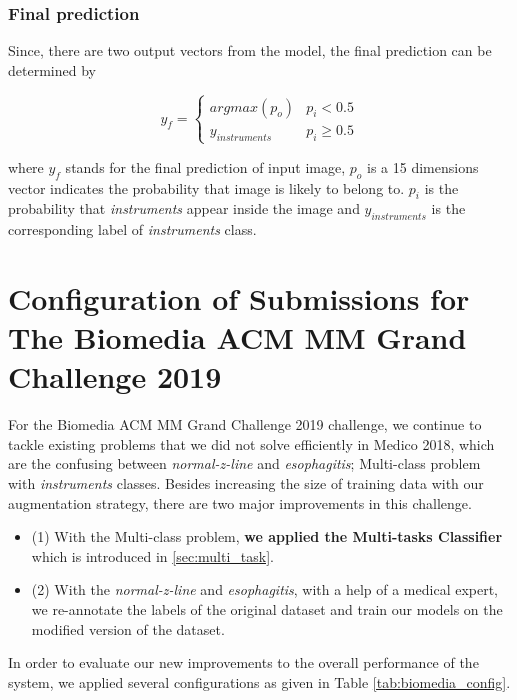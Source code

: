 \subsubsection*{Final prediction}
Since, there are two output vectors from the model, the final prediction can be determined by 

\begin{equation}
    y_{f} = \begin{cases}argmax(p_{o}) & p_{i} < 0.5\\y_{instruments} & p_{i} \geq 0.5\end{cases}
\end{equation}

where $y_{f}$ stands for the final prediction of input image, $p_{o}$ is a 15 dimensions vector indicates the probability that image is likely to belong to. $p_{i}$ is the probability that \textit{instruments} appear inside the image and $y_{instruments}$ is the corresponding label of \textit{instruments} class.

\section{Configuration of Submissions for The Biomedia ACM MM Grand Challenge 2019}
\label{5runs_config}
For the Biomedia ACM MM Grand Challenge 2019 challenge, we continue to tackle existing problems that we did not solve efficiently in Medico 2018, which are the confusing between \textit{normal-z-line} and \textit{esophagitis}; Multi-class problem with \textit{instruments} classes. Besides increasing the size of training data with our augmentation strategy, there are two major improvements in this challenge.
\begin{itemize}
    \item (1) With the Multi-class problem, \textbf{we applied the Multi-tasks Classifier} which is introduced in \ref{sec:multi_task}.
    \item (2) With the \textit{normal-z-line} and \textit{esophagitis}, with a help of a medical expert, we re-annotate the labels of the original dataset and train our models on the modified version of the dataset.
\end{itemize}

In order to evaluate our new improvements to the overall performance of the system, we applied several configurations as given in Table \ref{tab:biomedia_config}.

